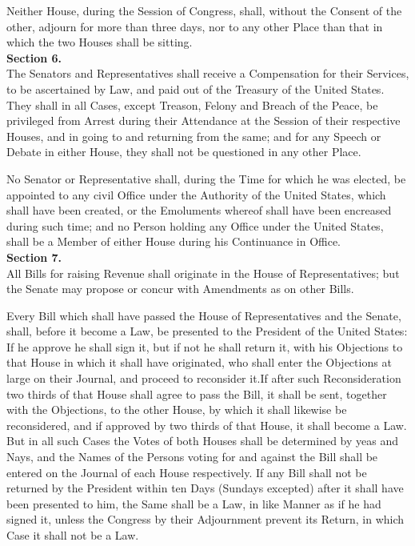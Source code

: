 Neither House, during the Session of Congress, shall, without the Consent of the other, adjourn for more than three days, nor to any other Place than that in which the two Houses shall be sitting.\\[0.01in]

{\large \textbf{Section 6.}}\\[0.01in]

The Senators and Representatives shall receive a Compensation for their Services, to be ascertained by Law, and paid out of the Treasury of the United States. They shall in all Cases, except Treason, Felony and Breach of the Peace, be privileged from Arrest during their Attendance at the Session of their respective Houses, and in going to and returning from the same; and for any Speech or Debate in either House, they shall not be questioned in any other Place.

No Senator or Representative shall, during the Time for which he was elected, be appointed to any civil Office under the Authority of the United States, which shall have been created, or the Emoluments whereof shall have been encreased during such time; and no Person holding any Office under the United States, shall be a Member of either House during his Continuance in Office.\\[0.01in]

{\large \textbf{Section 7.}}\\[0.01in]

All Bills for raising Revenue shall originate in the House of Representatives; but the Senate may propose or concur with Amendments as on other Bills.

Every Bill which shall have passed the House of Representatives and the Senate, shall, before it become a Law, be presented to the President of the United States: If he approve he shall sign it, but if not he shall return it, with his Objections to that House in which it shall have originated, who shall enter the Objections at large on their Journal, and proceed to reconsider it.If after such Reconsideration two thirds of that House shall agree to pass the Bill, it shall be sent, together with the Objections, to the other House, by which it shall likewise be reconsidered, and if approved by two thirds of that House, it shall become a Law. But in all such Cases the Votes of both Houses shall be determined by yeas and Nays, and the Names of the Persons voting for and against the Bill shall be entered on the Journal of each House respectively. If any Bill shall not be returned by the President within ten Days (Sundays excepted) after it shall have been presented to him, the Same shall be a Law, in like Manner as if he had signed it, unless the Congress by their Adjournment prevent its Return, in which Case it shall not be a Law.

